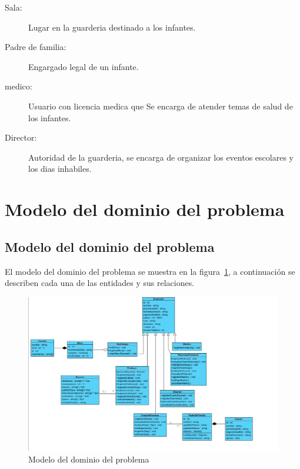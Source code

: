 \begin{description}
	
        \item[\hypertarget{tSala}{Sala:}] Lugar en la guarderia destinado a los infantes.

        
        \item[\hypertarget{tpadre}{Padre de familia:}] Engargado legal de un infante.

        
        \item[\hypertarget{tMedico}{medico:}] Usuario con licencia medica que Se encarga de atender temas de salud de los infantes.

        
        \item[\hypertarget{tdirector}{Director:}] Autoridad de la guarderia, se encarga de organizar los eventos escolares y los dias inhabiles.
        
\end{description}


\newpage
\section{Modelo del dominio del problema}
\label{sec:hechosDeNegocio}


\subsection{Modelo del dominio del problema}

	El modelo del dominio del problema se muestra en la figura~\ref{fig:modeloDeDominio}, a continuación se describen cada una de las entidades y sus relaciones.
	
\begin{figure}[htbp!]
	\begin{center}
		\includegraphics[angle=90,width=.58\textwidth]{images/diagramaClases.jpeg}
		\caption{Modelo del dominio del problema}
		\label{fig:modeloDeDominio}
	\end{center}
\end{figure}


